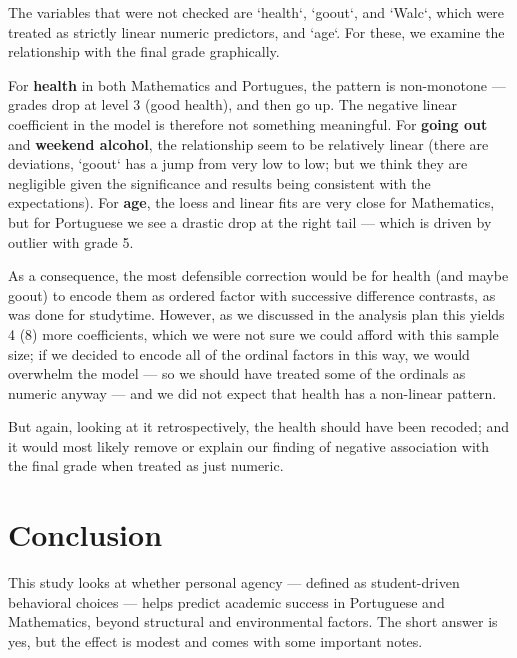\documentclass{article}
\begin{document}
\vspace{0.2em}
The variables that were not checked are `health`, `goout`, and `Walc`, which were treated as strictly linear numeric predictors, and `age`. For these, we examine the relationship with the final grade graphically.

\vspace{0.2em}
For \textbf{health} in both Mathematics and Portugues, the pattern is non-monotone --- grades drop at level 3 (good health), and then go up. The negative linear coefficient in the model is therefore not something meaningful. For \textbf{going out} and \textbf{weekend alcohol}, the relationship seem to be relatively linear (there are deviations, `goout` has a jump from very low to low; but we think they are negligible given the significance and results being consistent with the expectations). For \textbf{age}, the loess and linear fits are very close for Mathematics, but for Portuguese we see a drastic drop at the right tail --- which is driven by outlier with grade 5.

\vspace{0.2em}
As a consequence, the most defensible correction would be for health (and maybe goout) to encode them as ordered factor with successive difference contrasts, as was done for studytime. However, as we discussed in the analysis plan this yields 4 (8) more coefficients, which we were not sure we could afford with this sample size; if we decided to encode all of the ordinal factors in this way, we would overwhelm the model --- so we should have treated some of the ordinals as numeric anyway --- and we did not expect that health has a non-linear pattern.

\vspace{0.2em}
But again, looking at it retrospectively, the health should have been recoded; and it would most likely remove or explain our finding of negative association with the final grade when treated as just numeric.




\section{Conclusion}
\label{sec:conclusion}

This study looks at whether personal agency --- defined as student-driven behavioral choices --- helps predict academic success in Portuguese and Mathematics, beyond structural and environmental factors. The short answer is yes, but the effect is modest and comes with some important notes.
\end{document}
